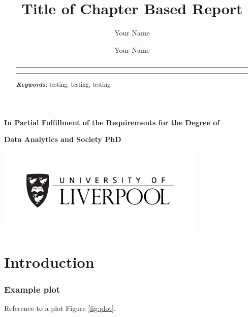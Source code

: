 \documentclass[a4paper, notitlepage]{extreport}
\title{Title of Chapter Based Report}
\author{Your Name}
\renewcommand*{\tableofcontents}{\listoftoc[{\contentsname}]{toc}}%
\providecommand{\keywords}[1]{\footnotesize\textbf{\textit{Keywords:}} #1}
\newcommand{\copyrightfont}{\linespread{1}\normalfont\rmfamily\fontsize{7}{8}\selectfont}
\begin{document}

    \maketitle

{\copyrightfont\author{Your Name}}

\date{}
    \thispagestyle{empty}
    \vskip 50pt
  \begin{abstract}
      \centering\begin{minipage}{\dimexpr\paperwidth-10cm}
          \hrule
          \vskip 5pt
    \lipsum[1-1]
    \vskip 5pt
    \hrule
    \vskip 10pt
\keywords{testing; testing; testing}
\end{minipage}
  \end{abstract}

\vskip 12pt

{\copyrightfont\centerline{\bfseries In Partial Fulfillment of the Requirements for the Degree of}}
{\copyrightfont\centerline{\bfseries Data Analytics and Society PhD}}
\centerline{\includegraphics[width = 100mm]{./template/uolLogo.png}}
\newpage

\tableofcontents

\listoffigures

\listoftables

\newpage


\chapter{Introduction}

\lipsum[1-2]

\hypertarget{example-plot}{%
\subsection{Example plot}\label{example-plot}}

Reference to a plot Figure \ref{fig:plot}.

\lipsum[1-1]
\end{document}
